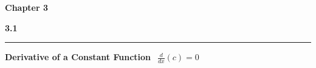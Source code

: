 \documentclass{article}
\begin{document}
\Huge\textbf{Chapter 3}
\vspace{16pt}

\begin{center}
\Large\textbf{3.1}

\noindent\hfill\rule{0.3\textwidth}{.4pt}\hfill
\vspace{12pt}
\end{center}

	\large\textbf{Derivative of a Constant Function}
	$\>\> \frac{d}{dx} (c) = 0$
	\vspace{12pt}
\end{document}
